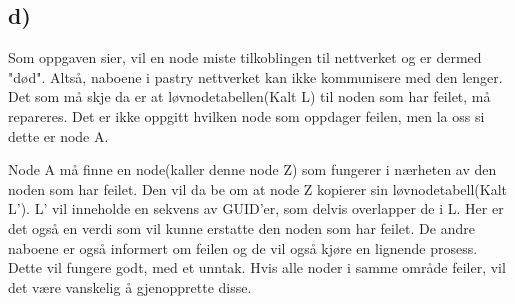 \documentclass{article}
\begin{document}
\subsection*{d)}
Som oppgaven sier, vil en node miste tilkoblingen til nettverket og er dermed "død". Altså, naboene i pastry nettverket kan ikke kommunisere med den lenger. Det som må skje da er at løvnodetabellen(Kalt L) til noden som har feilet, må repareres. Det er ikke oppgitt hvilken node som oppdager feilen, men la oss si dette er node A. 

Node A må finne en node(kaller denne node Z) som fungerer i nærheten av den noden som har feilet. Den vil da be om at node Z kopierer sin løvnodetabell(Kalt L'). L' vil inneholde en sekvens av GUID'er, som delvis overlapper de i L. Her er det også en verdi som vil kunne erstatte den noden som har feilet. De andre naboene er også informert om feilen og de vil også kjøre en lignende prosess. Dette vil fungere godt, med et unntak. Hvis alle noder i samme område feiler, vil det være vanskelig å gjenopprette disse.
\end{document}

